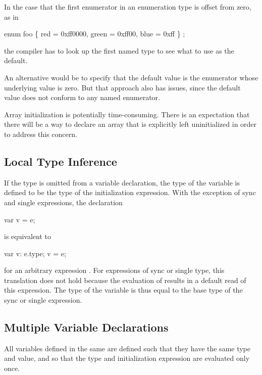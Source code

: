 \begin{openissue}
In the case that the first enumerator in an enumeration type is offset
from zero, as in
\begin{example}
enum foo \{ red = 0xff0000, green = 0xff00, blue = 0xff \} ;
\end{example}
the compiler has to look up the first named type to see what to use as
the default.  

An alternative would be to specify that the default
value is the enumerator whose underlying value is zero.  But that approach also
has issues, since the default value does not conform to any named enumerator.
\end{openissue}

\begin{openissue}
Array initialization is potentially time-consuming.  There is an
expectation that there will be a way to declare an array that is
explicitly left uninitialized in order to address this concern.
\end{openissue}

\subsection{Local Type Inference}
\label{Local_Type_Inference}

If the type is omitted from a variable declaration, the type of the
variable is defined to be the type of the initialization expression.
With the exception of sync and single expressions, the declaration
\begin{chapel}
var v = e;
\end{chapel}
is equivalent to
\begin{chapel}
var v: e.type;
v = e;
\end{chapel}
for an arbitrary expression .  For expressions of sync or
single type, this translation does not hold because the evaluation
of  results in a default read of this expression.  The type of
the variable is thus equal to the base type of the sync or single
expression.

\subsection{Multiple Variable Declarations}
\label{Multiple_Variable_Declarations}

All variables defined in the same  are defined
such that they have the same type and value, and so that the type and
initialization expression are evaluated only once.

